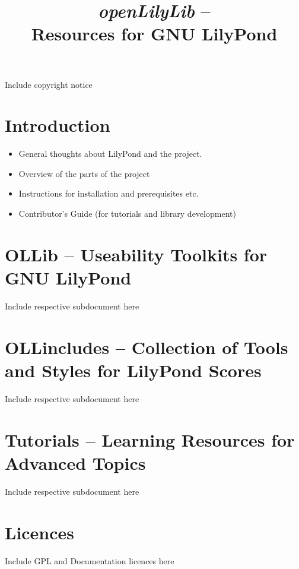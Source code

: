 \documentclass{OLLbook}
\begin{document}
\title{\textit{openLilyLib} -- \\
	Resources for GNU LilyPond}

\maketitle

Include copyright notice

\tableofcontents

\part{Introduction}

\begin{itemize}
\item General thoughts about LilyPond and the project.
\item Overview of the parts of the project
\item Instructions for installation and prerequisites etc.
\item Contributor's Guide (for tutorials and library development)
\end{itemize}


\part{OLLib -- Useability Toolkits for GNU LilyPond}

Include respective subdocument here

\part{OLLincludes -- Collection of Tools and Styles for LilyPond Scores}

Include respective subdocument here



\part{Tutorials -- Learning Resources for Advanced Topics}

Include respective subdocument here

\part{Licences}

Include GPL and Documentation licences here
\end{document}
